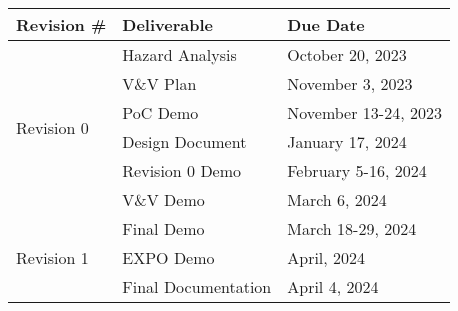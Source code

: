 \documentclass[12pt]{article}
\begin{document}
\begin{table}[H]
\begin{tabular}{|l|l|l|}
\hline
Revision \#                 & Deliverable         & Due Date             \\ \hline
\multirow{6}{*}{Revision 0} & Hazard Analysis     & October 20, 2023     \\ \cline{2-3} 
                            & V\&V Plan           & November 3, 2023     \\ \cline{2-3} 
                            & PoC Demo            & November 13-24, 2023 \\ \cline{2-3} 
                            & Design Document     & January 17, 2024     \\ \cline{2-3} 
                            & Revision 0 Demo     & February 5-16, 2024  \\ \cline{2-3} 
                            & V\&V Demo           & March 6, 2024        \\ \hline
\multirow{3}{*}{Revision 1} & Final Demo          & March 18-29, 2024    \\ \cline{2-3} 
                            & EXPO Demo           & April, 2024          \\ \cline{2-3} 
                            & Final Documentation & April 4, 2024        \\ \hline
\end{tabular}
\end{table}
\end{document}

